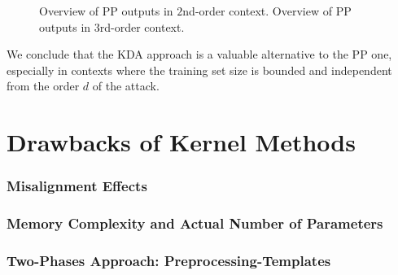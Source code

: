 \begin{figure}[t]
\caption[Overview of Projection Pursuit outputs in $2$nd-order and $3$rd-order context.]{ Overview of PP outputs in $2$nd-order context.  Overview of PP outputs in $3$rd-order context. }
\end{figure}

We conclude that the KDA approach is a valuable alternative to the PP one, especially in contexts where the training set size is bounded and independent from the order $d$ of the attack.


\section{Drawbacks of Kernel Methods}
\subsubsection{Misalignment Effects}
\subsubsection{Memory Complexity and Actual Number of Parameters}
\subsubsection{Two-Phases Approach: Preprocessing-Templates}
